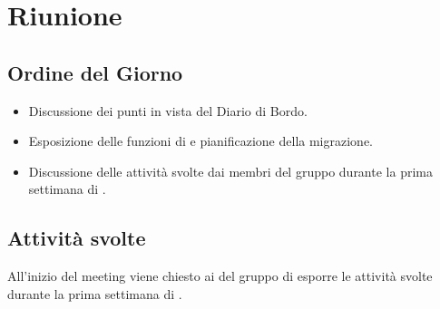 \section{Riunione}
\subsection{Ordine del Giorno}
\begin{itemize}
	\item Discussione dei punti in vista del Diario di Bordo.
	\item Esposizione delle funzioni di  e pianificazione della migrazione.
	\item Discussione delle attività svolte dai membri del gruppo durante la prima settimana di .
\end{itemize}

\subsection{Attività svolte}
\par All'inizio del meeting viene chiesto ai del gruppo di esporre le attività svolte durante la prima settimana di .
